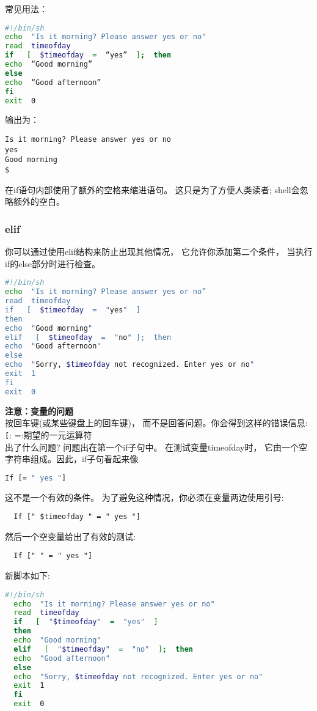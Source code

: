 \documentclass[a4paper]{ctexart}
\begin{document}
常见用法：
\begin{lstlisting}[language=sh]
#!/bin/sh
echo  "Is it morning? Please answer yes or no"
read  timeofday
if   [  $timeofday  =  “yes”  ];  then
echo  “Good morning”
else
echo  “Good afternoon”
fi
exit  0

\end{lstlisting}
输出为：
\begin{lstlisting}
Is it morning? Please answer yes or no
yes
Good morning
$
\end{lstlisting}

在if语句内部使用了额外的空格来缩进语句。
这只是为了方便人类读者;
shell会忽略额外的空白。

\subsubsection{elif}
你可以通过使用elif结构来防止出现其他情况，
它允许你添加第二个条件，
当执行if的else部分时进行检查。

\begin{lstlisting}[language=sh]
#!/bin/sh
echo  "Is it morning? Please answer yes or no”
read  timeofday
if   [  $timeofday  =  "yes"  ]
then
echo  "Good morning"
elif   [  $timeofday  =  "no" ];  then
echo  "Good afternoon"
else
echo  "Sorry, $timeofday not recognized. Enter yes or no"
exit  1
fi
exit  0
\end{lstlisting}

\textbf{注意：变量的问题}\\
按回车键(或某些键盘上的回车键)，
而不是回答问题。你会得到这样的错误信息: \\
\texttt{[}: =:期望的一元运算符 \\
出了什么问题?
问题出在第一个if子句中。
在测试变量timeofday时，
它由一个空字符串组成。因此，if子句看起来像 
\begin{lstlisting}[language=sh]
  If [= " yes "]
\end{lstlisting} 
这不是一个有效的条件。
为了避免这种情况，你必须在变量两边使用引号:
\begin{lstlisting} 
  If [" $timeofday " = " yes "]
\end{lstlisting}
然后一个空变量给出了有效的测试: 
\begin{lstlisting}
  If [" " = " yes "]
\end{lstlisting}
 
新脚本如下:
\begin{lstlisting}[language=sh]
  #!/bin/sh
  echo  "Is it morning? Please answer yes or no"
  read  timeofday
  if   [  "$timeofday"  =  "yes"  ]
  then
  echo  "Good morning"
  elif   [  "$timeofday"  =  "no"  ];  then
  echo  "Good afternoon"
  else
  echo  "Sorry, $timeofday not recognized. Enter yes or no"
  exit  1
  fi
  exit  0
\end{lstlisting}
\end{document}
